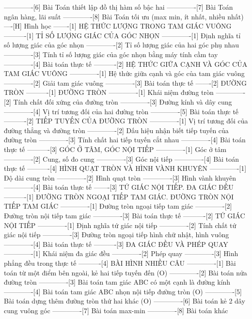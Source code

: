 -------------[6] Bài Toán thiết lập đồ thị hàm số bậc hai
-------------[7] Bài Toán ngân hàng, lãi suất
-------------[8] Bài Toán tối ưu (max min, ít nhất, nhiều nhất)
----[H] Hình học
-------[1] HỆ THỨC LƯỢNG TRONG TAM GIÁC VUÔNG
----------[1] TỈ SỐ LƯỢNG GIÁC CỦA GÓC NHỌN
-------------[1] Định nghĩa tỉ số lượng giác của góc nhọn
-------------[2] Tỉ số lượng giác của hai góc phụ nhau
-------------[3] Tính tỉ số lượng giác của góc nhọn bằng máy tính cầm tay
-------------[4] Bài toán thực tế
----------[2] HỆ THỨC GIỮA CẠNH VÀ GÓC CỦA TAM GIÁC VUÔNG
-------------[1] Hệ thức giữa cạnh và góc của tam giác vuông
-------------[2] Giải tam giác vuông
-------------[3] Bài toán thực tế
-------[2] ĐƯỜNG TRÒN
----------[1] ĐƯỜNG TRÒN
-------------[1] Khái niệm đường tròn
-------------[2] Tính chất đối xứng của đường tròn
-------------[3] Đường kính và dây cung
-------------[4] Vị trí tương đối của hai đường tròn
-------------[5] Bài toán thực tế
----------[2] TIẾP TUYẾN CỦA ĐƯỜNG TRÒN
-------------[1] Vị trí tương đối của đường thẳng và đường tròn
-------------[2] Dấu hiệu nhận biết tiếp tuyến của đường tròn
-------------[3] Tính chất hai tiếp tuyến cắt nhau
-------------[4] Bài toán thực tế
----------[3] GÓC Ở TÂM, GÓC NỘI TIẾP
-------------[1] Góc ở tâm
-------------[2] Cung, số đo cung
-------------[3] Góc nội tiếp
-------------[4] Bài toán thực tế
----------[4] HÌNH QUẠT TRÒN VÀ HÌNH VÀNH KHUYÊN
-------------[1] Độ dài cung tròn
-------------[2] Hình quạt tròn
-------------[3] Hình vành khuyên
-------------[4] Bài toán thực tế
-------[3] TỨ GIÁC NỘI TIẾP. ĐA GIÁC ĐỀU
----------[1] ĐƯỜNG TRÒN NGOẠI TIẾP TAM GIÁC. ĐƯỜNG TRÒN NỘI TIẾP TAM GIÁC
-------------[1] Đường tròn ngoại tiếp tam giác
-------------[2] Đường tròn nội tiếp tam giác
-------------[3] Bài toán thực tế
----------[2] TỨ GIÁC NỘI TIẾP
-------------[1] Định nghĩa tứ giác nội tiếp
-------------[2] Tính chất tứ giác nội tiếp
-------------[3] Đường tròn ngoại tiếp hình chữ nhật, hình vuông
-------------[4] Bài toán thực tế
----------[3] ĐA GIÁC ĐỀU VÀ PHÉP QUAY
-------------[1] Khái niệm đa giác đều
-------------[2] Phép quay
-------------[3] Hình phẳng đều trong thực tế
----------[4] BÀI HÌNH NHIỀU CÂU
-------------[1] Bài toán từ một điểm bên ngoài, kẻ hai tiếp tuyến đến (O)
-------------[2] Bài toán nửa đường tròn
-------------[3] Bài toán tam giác ABC có một cạnh là đường kính
-------------[4] Bài toán tam giác ABC nhọn nội tiếp đường tròn (O)
-------------[5] Bài toán dựng thêm đường tròn thứ hai khác (O)
-------------[6] Bài toán kẻ 2 dây cung vuông góc
-------------[7] Bài toán max-min
-------------[8] Bài toán khác
